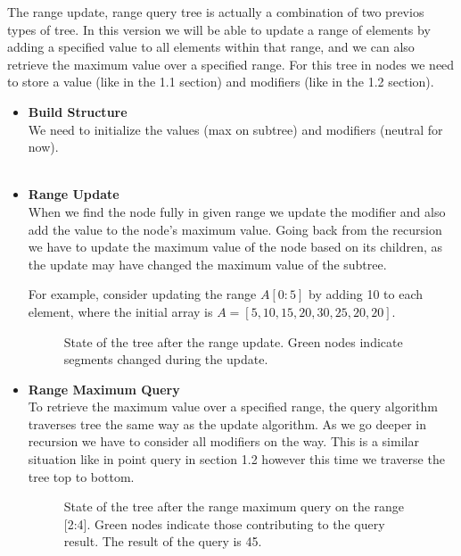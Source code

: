\documentclass{article}
\begin{document}
The range update, range query tree is actually a combination of two previos types of tree.
In this version we will be able to update a range of elements by adding a specified value to all elements within that range, and we can also retrieve the maximum value over a specified range.
For this tree in nodes we need to store a value (like in the 1.1 section) and modifiers (like in the 1.2 section).


\begin{itemize}
    \item \textbf{Build Structure} \\
    We need to initialize the values (max on subtree) and modifiers (neutral for now). \\
     \\

    \item \textbf{Range Update} \\
    When we find the node fully in given range we update the modifier and also add the value to the node's maximum value.
    Going back from the recursion we have to update the maximum value of the node based on its children, as the update may have changed the maximum value of the subtree.
     \\

    \FloatBarrier

    For example, consider updating the range \( A[0:5] \) by adding 10 to each element, where the initial array is \( A = [5, 10, 15, 20, 30, 25, 20, 20] \).

    \begin{figure}[H]
        \centering
        
        \caption{State of the tree after the range update. Green nodes indicate segments changed during the update.}
        \label{fig:segment_tree_4}
    \end{figure}

    \item \textbf{Range Maximum Query} \\
    To retrieve the maximum value over a specified range, the query algorithm traverses tree the same way as the update algorithm.
    As we go deeper in recursion we have to consider all modifiers on the way. This is a similar situation like in point query in section 1.2 however this time we traverse the tree top to bottom.
    

    \begin{figure}[H]
        \centering
        
        \caption{State of the tree after the range maximum query on the range [2:4]. Green nodes indicate those contributing to the query result. The result of the query is 45.}
        \label{fig:segment_tree_5}
    \end{figure}

\end{itemize}
\end{document}
